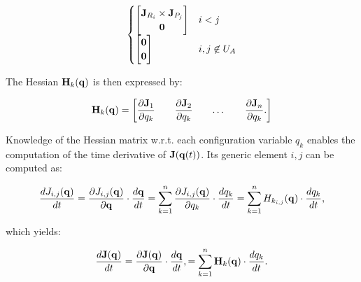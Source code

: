 \documentclass[10pt,landscape,a4paper]{article}
\begin{document}
\begin{multicols}{2}
\begin{equation}
\begin{cases}
\begin{bmatrix}
\mathbf J_{R_i} \times \mathbf J_{P_j} \\ 
\mathbf{0} \\
\end{bmatrix} & i < j \\

\begin{bmatrix}
\mathbf{0} \\ 
\mathbf{0} \\
\end{bmatrix} & i,j \not\in U_A
\end{cases}
\end{equation}

The Hessian $\mathbf H_k(\mathbf q)$ is then expressed by:

\begin{equation}
\mathbf H_k(\mathbf q) =
\begin{bmatrix}
\dfrac{\partial \mathbf J_1}{\partial q_k} && \dfrac{\partial \mathbf J_2}{\partial q_k} && \dots && \dfrac{\partial \mathbf J_n}{\partial q_k}.
\end{bmatrix}
\end{equation}

Knowledge of the Hessian matrix w.r.t. each configuration variable $q_k$ enables the computation of the time derivative of $\mathbf J(\mathbf q(t))$. Its generic element $i,j$ can be computed as:

\begin{equation}
\begin{aligned}
\dfrac{d J_{i,j}(\mathbf q)}{dt}
=
\dfrac{\partial J_{i,j}(\mathbf q)}{\partial \mathbf q} \cdot \dfrac{d\mathbf q}{dt}
=
\sum_{k=1}^{n} \dfrac{\partial J_{i,j}(\mathbf q)}{\partial q_k} \cdot \dfrac{dq_k}{dt}
=
\sum_{k=1}^{n} H_{k_{i,j}}(\mathbf q) \cdot \dfrac{dq_k}{dt},
\end{aligned}
\end{equation}

which yields:

\begin{equation}
\dfrac{d\mathbf J(\mathbf q)}{dt}
=
\dfrac{\partial \mathbf J(\mathbf q)}{\partial \mathbf q} \cdot \dfrac{d\mathbf q}{dt},
=
\sum_{k=1}^{n} \mathbf{H}_k(\mathbf q) \cdot  \dfrac{dq_k}{dt}.
\end{equation}




\end{multicols}
\end{document}
